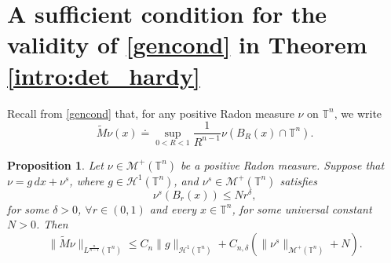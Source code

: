 \documentclass[10pt,reqno]{amsart}
\numberwithin{equation}{section}
\newcommand{\T}{\mathbb{T}}
\theoremstyle{plain}
\newtheorem{prop}[Teo]{Proposition}
\theoremstyle{definition}
\theoremstyle{remark}
\begin{document}
\section{A sufficient condition for the validity of \eqref{gencond} in Theorem \ref{intro:det_hardy}}\label{AppB}

Recall from \eqref{gencond} that, for any positive Radon measure $\nu$ on $\T^n$, we write
\[
\tilde M \nu (x)\doteq\sup_{0 <R <1}\frac{1}{R^{n-1}}\nu(B_R(x)\cap \T^n).
\]


\begin{prop}\label{p:tildeMdivA}
Let $\nu\in \mathcal{M}^+(\T^n)$ be a positive Radon measure. Suppose that $\nu=g\,dx+\nu^s$, where $g\in \mathcal{H}^1(\T^n)$, and $\nu^s\in \mathcal{M}^+(\T^n)$  satisfies 
\begin{equation}\label{mus_ball}
\nu^s(B_r(x))\leq N r^\delta,
\end{equation}
for some $\delta>0$, $\forall r\in (0,1)$ and every $x\in \T^n$, for some universal constant $N>0$. Then
\begin{equation}\label{est:div_in_critical}
\|\tilde M\nu\|_{L^\frac{n}{n - 1}(\T^n)}\leq C_n\|g\|_{\mathcal{H}^1(\T^n)}+ C_{n,\delta}\left(\|\nu^s\|_{\mathcal{M}^+(\T^n)}+N \right).
\end{equation}
\end{prop}
\end{document}
